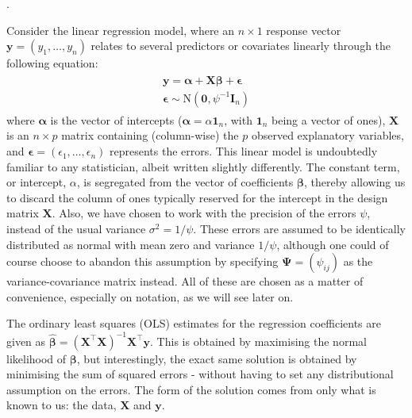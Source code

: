 .


Consider the linear regression model, where an $n \times 1$ response vector $\mathbf y = (y_1, \dots, y_n)$ relates to several predictors or covariates linearly through the following equation:
\begin{align}\label{eq:linmod1}
	\begin{gathered}
		\mathbf y = \boldsymbol\alpha + \mathbf X \boldsymbol\beta + \boldsymbol\epsilon \\
		\boldsymbol\epsilon \sim \text{N}(\mathbf 0, \psi^{-1}\mathbf I_n)
	\end{gathered}
\end{align}
where $\boldsymbol\alpha$ is the vector of intercepts ($\boldsymbol\alpha = \alpha\mathbf 1_n$, with $\mathbf 1_n$ being a vector of ones), $\mathbf X$ is an $n \times p$ matrix containing (column-wise) the $p$ observed explanatory variables, and $\boldsymbol\epsilon = (\epsilon_1, \dots, \epsilon_n)$ represents the errors. This linear model is undoubtedly familiar to any statistician, albeit written slightly differently. The constant term, or intercept, $\alpha$, is segregated from the vector of coefficients $\boldsymbol\beta$, thereby allowing us to discard the column of ones typically reserved for the intercept in the design matrix $\mathbf X$. Also, we have chosen to work with the precision of the errors $\psi$, instead of the usual variance $\sigma^2 = 1/\psi$. These errors are assumed to be identically distributed as normal with mean zero and variance $1/\psi$, although one could of course choose to abandon this assumption by specifying $\boldsymbol\Psi = (\psi_{ij})$ as the variance-covariance matrix instead. All of these are chosen as a matter of convenience, especially on notation, as we will see later on.

The ordinary least squares (OLS) estimates for the regression coefficients are given as $\hat{\boldsymbol\beta} = (\mathbf X^\top \mathbf X)^{-1} \mathbf X^\top \mathbf y$. This is obtained by maximising the normal likelihood of $\boldsymbol\beta$, but interestingly, the exact same solution is obtained by minimising the sum of squared errors - without having to set any distributional assumption on the errors. The form of the solution comes from only what is known to us: the data, $\mathbf X$ and $\mathbf y$.


